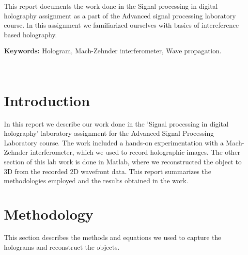 \documentclass[12pt,a4paper,english
]{tunithesis}
\begin{document}
\vspace{0.5cm}


\noindent
This report documents the work done in the Signal processing in digital holography assignment as a part of the Advanced signal processing laboratory course. In this assignment we familiarized ourselves with basics of intereference based holography.
~

\noindent\textbf{Keywords:} Hologram, Mach-Zehnder interferometer, Wave propagation.

~




\setcounter{tocdepth}{3}              %
\tableofcontents                      %


\if@twoside
\cleardoublepage
\fi


\renewcommand{\chaptername}{} %


\chapter{Introduction}
\label{ch:intro}
In this report we describe our work done in the 'Signal processing in digital holography' laboratory assignment for the Advanced Signal Processing Laboratory course. The work included a hands-on experimentation with a Mach-Zehnder interferometer, which we used to record holographic images. The other section of this lab work is done in Matlab, where we reconstructed the object to 3D from the recorded 2D wavefront data. This report summarizes the methodologies employed and the results obtained in the work. 

\setcounter{page}{1} 

\chapter{Methodology}
This section describes the methods and equations we used to capture the holograms and reconstruct the objects.

\label{sec:methodology}
\end{document}
